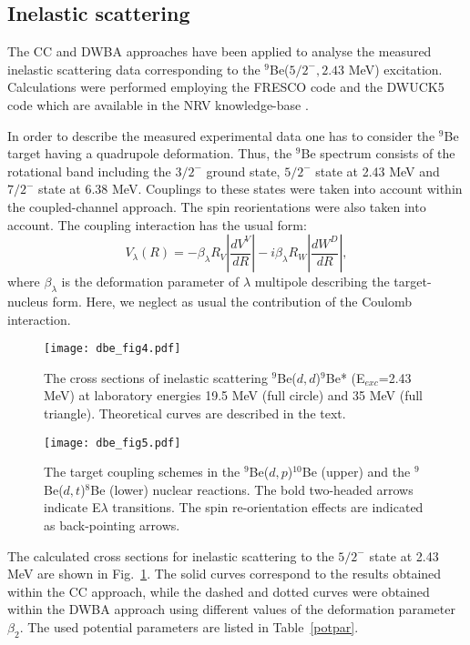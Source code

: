 \documentclass[
12pt, %
oneside, %
english, %
onehalfspacing, %
onehalfspacing, %
headsepline, %
]{MastersDoctoralThesis} %
\begin{document}
\subsection{Inelastic scattering}
The CC and DWBA approaches have been applied to analyse the measured inelastic scattering data corresponding to the ${}^9$Be($5/2^-, 2.43$ MeV) excitation. Calculations were performed employing the FRESCO code \cite{fresco} and the DWUCK5 code \cite{kunz} which are available in the NRV knowledge-base \cite{nrv}.

In order to describe the measured experimental data one has to consider the ${}^9$Be target having a quadrupole deformation. Thus, the ${}^9$Be spectrum consists of the rotational band including the  $3/2^-$ ground state, $5/2^-$ state at 2.43 MeV and $7/2^-$ state at 6.38 MeV. Couplings to these states were taken into account within the coupled-channel approach. The spin reorientations were also taken into account. The coupling interaction has the usual form:
\begin{equation}
V_\lambda(R)=-\beta_\lambda R_V \left|\frac{d V^V}{dR}\right| - i \beta_\lambda R_W \left|\frac{d W^D}{dR}\right|,
\end{equation}
where $\beta_\lambda$ is the deformation parameter of $\lambda$ multipole describing the target-nucleus form. Here, we neglect as usual the contribution of the Coulomb interaction.

\begin{figure}[tp]
\centering
\texttt{[image: dbe\_fig4.pdf]}
\decoRule
\caption{\label{dbe_fig4} \footnotesize The cross sections of inelastic scattering ${}^9$Be($d,d$)$^9$Be* (E$_{exc}$=2.43 MeV) at laboratory energies 19.5 MeV (full circle) and 35 MeV (full triangle). Theoretical curves are described in the text.}
\end{figure} 


\begin{figure}[bp]
\centering
\texttt{[image: dbe\_fig5.pdf]}
\decoRule
\caption{ \label{dbe_fig5} \footnotesize The target coupling schemes in the ${}^9$Be($d,p$)$^{10}$Be (upper) and the ${}^9$Be($d,t$)$^8$Be (lower) nuclear reactions. The bold two-headed arrows indicate E$\lambda$ transitions. The spin re-orientation effects are indicated as back-pointing arrows.}
\end{figure} 

The calculated cross sections for inelastic scattering to the $5/2^-$ state at 2.43 MeV are shown in Fig.~\ref{dbe_fig4}. The solid curves correspond to the results obtained within the CC approach, while the dashed and dotted curves were obtained within the DWBA approach using  different values of the deformation parameter $\beta_2$. The used potential parameters are listed in Table~\ref{potpar}.
\end{document}
